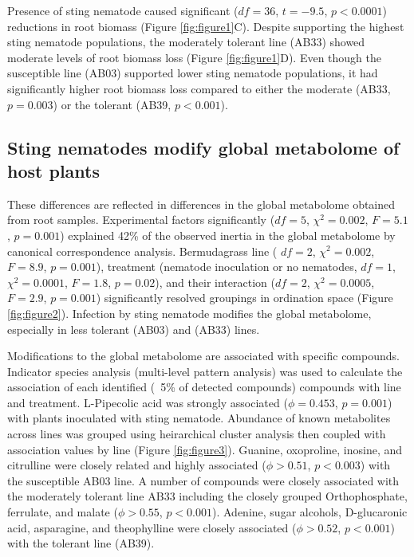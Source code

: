 \documentclass[9pt,lineno]{elife}
\begin{document}
Presence of sting nematode caused significant ($df = 36$, $t = -9.5$, $p < 0.0001$) reductions in root biomass (Figure \ref{fig:figure1}C).  Despite supporting the highest sting nematode populations, the moderately tolerant line (AB33) showed moderate levels of root biomass loss (Figure \ref{fig:figure1}D). Even though the susceptible line (AB03) supported lower sting nematode populations, it had significantly higher root biomass loss compared to either the moderate (AB33, $p = 0.003$) or the tolerant (AB39, $p < 0.001$).  

\subsection{Sting nematodes modify global metabolome of host plants}
These differences are reflected in differences in the global metabolome obtained from root samples.  Experimental factors significantly ($df = 5$, $\chi^2 = 0.002$, $F = 5.1$, $p = 0.001$) explained 42\% of the observed inertia in the global metabolome by canonical correspondence analysis.  Bermudagrass line ( $df = 2$, $\chi^2 = 0.002$, $F = 8.9$, $p = 0.001$), treatment (nematode inoculation or no nematodes, $df = 1$, $\chi^2 = 0.0001$, $F = 1.8$, $p = 0.02$), and their interaction ($df = 2$, $\chi^2 = 0.0005$, $F = 2.9$, $p = 0.001$) significantly resolved groupings in ordination space (Figure \ref{fig:figure2}).  Infection by sting nematode modifies the global metabolome, especially in less tolerant (AB03) and (AB33) lines.

Modifications to the global metabolome are associated with specific compounds.  Indicator species analysis (multi-level pattern analysis) was used to calculate the association of each identified (~5\% of detected compounds) compounds with line and treatment.  L-Pipecolic acid was strongly associated ($\phi = 0.453$, $p = 0.001$) with plants inoculated with sting nematode.  Abundance of known metabolites across lines was grouped using heirarchical cluster analysis then coupled with association values by line (Figure \ref{fig:figure3}).  Guanine, oxoproline, inosine, and citrulline were closely related and highly associated ($\phi >0.51$, $p < 0.003$) with the susceptible AB03 line.  A number of compounds were closely associated with the moderately tolerant line AB33 including the closely grouped Orthophosphate, ferrulate, and malate ($\phi > 0.55$, $p < 0.001$). Adenine, sugar alcohols, D-glucaronic acid, asparagine, and theophylline were closely associated ($\phi > 0.52$, $p < 0.001$) with the tolerant line (AB39).  
\end{document}
